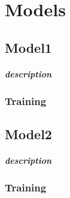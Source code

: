 \chapter{Models}

\section{Model1}
\paragraph{description}
\subsection{Training}

\section{Model2}
\paragraph{description}
\subsection{Training}